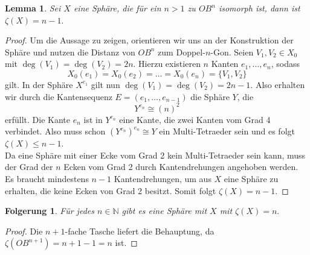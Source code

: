 \documentclass[12pt,titlepage,twoside,cleardoublepage]{article}
\theoremstyle{nummermitklammern}
\newtheorem{lemma}[temp]{Lemma}
\newtheorem{folgerung}[temp]{Folgerung}
\newtheorem{lemma}[zahl]{Lemma}
\newtheorem{folgerung}[zahl]{Folgerung}
\numberwithin{equation}{section}
\begin{document}
\begin{lemma}
Sei $X$ eine Sphäre, die für ein $n>1$ zu $OB^n$ isomorph ist, dann ist $\zeta(X)=n-1.$
\end{lemma}
\begin{proof}
Um die Aussage zu zeigen, orientieren wir uns an der Konstruktion der Sphäre und nutzen die Distanz von $OB^n$ zum Doppel-$n$-Gon. Seien $V_1,V_2\in X_0$ mit $\deg(V_1)=\deg(V_2)=2n$. Hierzu existieren $n$ Kanten $e_1,\ldots,e_n$, sodass 
\[
X_0(e_1)=X_0(e_2)=\ldots=X_0(e_n)=\{V_1,V_2\}
\] gilt.
In der Sphäre $X^{e_1}$ gilt nun $\deg(V_1)=\deg(V_2)=2n-1$. Also erhalten wir durch die Kantensequenz $E=(e_1,\ldots,e_{n-1})$ die Sphäre $Y$, die 
\[
Y^{e_n}\cong (n)^2
\] erfüllt. Die Kante $e_n$ ist in $Y^{e_n}$ eine Kante, die zwei Kanten vom Grad 4 verbindet. Also muss schon ${(Y^{e_n})}^{e_n}\cong Y$ ein Multi-Tetraeder sein und
 es folgt $\zeta(X)\leq n-1$. \\
Da eine Sphäre mit einer Ecke vom Grad 2 kein Multi-Tetraeder sein kann, muss der Grad der $n$ Ecken vom Grad 2 durch Kantendrehungen angehoben werden. Es braucht mindestens $n-1$ Kantendrehungen, um aus $X$ eine Sphäre zu erhalten, die keine Ecken von Grad 2 besitzt. Somit folgt $\zeta(X)=n-1.$
\end{proof}
\begin{folgerung}
Für jedes $n \in \mathbb{N}$ gibt es eine Sphäre mit $X$ mit $\zeta(X)=n.$
\end{folgerung}
\begin{proof}
Die $n+1$-fache Tasche liefert die Behauptung, da $\zeta(OB^{n+1})=n+1-1=n$ ist.
\end{proof}
\end{document}
